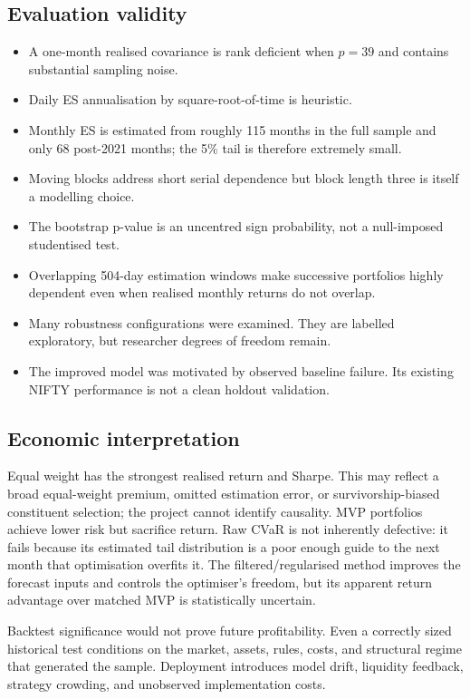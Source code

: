 \documentclass[11pt,a4paper]{article}
\begin{document}
\subsection{Evaluation validity}

\begin{itemize}
  \item A one-month realised covariance is rank deficient when $p=39$ and contains substantial sampling noise.
  \item Daily ES annualisation by square-root-of-time is heuristic.
  \item Monthly ES is estimated from roughly 115 months in the full sample and only 68 post-2021 months; the 5\% tail is therefore extremely small.
  \item Moving blocks address short serial dependence but block length three is itself a modelling choice.
  \item The bootstrap p-value is an uncentred sign probability, not a null-imposed studentised test.
  \item Overlapping 504-day estimation windows make successive portfolios highly dependent even when realised monthly returns do not overlap.
  \item Many robustness configurations were examined. They are labelled exploratory, but researcher degrees of freedom remain.
  \item The improved model was motivated by observed baseline failure. Its existing NIFTY performance is not a clean holdout validation.
\end{itemize}

\subsection{Economic interpretation}

Equal weight has the strongest realised return and Sharpe. This may reflect a broad equal-weight premium, omitted estimation error, or survivorship-biased constituent selection; the project cannot identify causality. MVP portfolios achieve lower risk but sacrifice return. Raw CVaR is not inherently defective: it fails because its estimated tail distribution is a poor enough guide to the next month that optimisation overfits it. The filtered/regularised method improves the forecast inputs and controls the optimiser's freedom, but its apparent return advantage over matched MVP is statistically uncertain.

Backtest significance would not prove future profitability. Even a correctly sized historical test conditions on the market, assets, rules, costs, and structural regime that generated the sample. Deployment introduces model drift, liquidity feedback, strategy crowding, and unobserved implementation costs.
\end{document}
